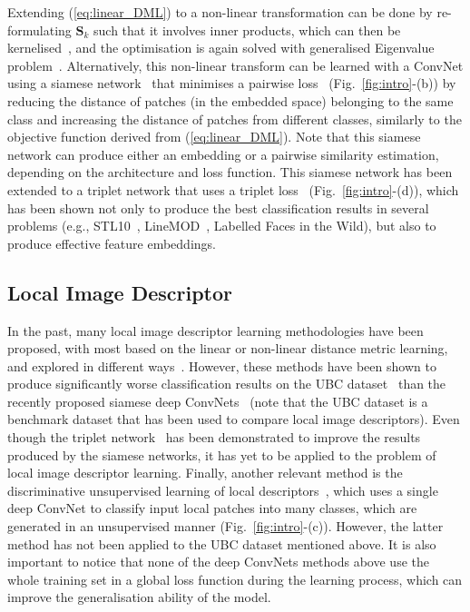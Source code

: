 \documentclass[10pt,twocolumn,letterpaper]{article}
\begin{document}
Extending (\ref{eq:linear_DML}) to a non-linear transformation can be done by re-formulating $\mathbf{S}_k$ such that it involves inner products, which can then be kernelised~\cite{sugiyama2007dimensionality}, and the optimisation is again solved with generalised Eigenvalue problem~\cite{sugiyama2007dimensionality}.
Alternatively, this non-linear transform can be learned with a ConvNet using a siamese network~\cite{bromley1993signature} that minimises a pairwise loss~\cite{chopra2005learning} (Fig.~\ref{fig:intro}-(b)) by reducing the distance of patches (in the embedded space) belonging to the same class and increasing the distance of patches from different classes, similarly to the objective function derived from (\ref{eq:linear_DML}).  Note that this siamese network can produce either an embedding or a pairwise similarity estimation, depending on the architecture and loss function.  This siamese network has been extended to a triplet network that uses a triplet loss~\cite{Wangcvpr14,hoffer2014deep,SchroffKPcvpr15,wohlhartcvpr15} (Fig.~\ref{fig:intro}-(d)), which has been shown not only to produce the best classification results in several problems (e.g., STL10~\cite{coates2011analysis}, LineMOD~\cite{hinterstoisser2012gradient}, Labelled Faces in the Wild), but also to produce effective feature embeddings.  


\subsection{Local Image Descriptor}


In the past, many local image descriptor learning methodologies have been proposed, with 
most based on the linear or non-linear distance metric learning, and explored in different ways~\cite{brownpami10,carneiro2010automatic,Simonyanpami14,trzcinski2013boosting}.  However, these methods have been shown to produce significantly worse classification results on the UBC dataset~\cite{UBC_dataset,brownpami10,snavely2008modeling} than the recently proposed siamese deep ConvNets~\cite{Han_cvpr15,masci2014descriptor,ZagoruykoCVPR15} (note that the UBC dataset is a benchmark dataset that has been used to compare local image descriptors).
Even though the triplet network~\cite{Wangcvpr14,hoffer2014deep,SchroffKPcvpr15,wohlhartcvpr15} has been demonstrated to improve the results produced by the siamese networks, it has yet to be applied to the problem of local image descriptor learning.
Finally, another relevant method is the discriminative unsupervised learning of local descriptors~\cite{dosovitskiy2014discriminative}, which uses a single deep ConvNet to classify input local patches into many classes, which are generated in an unsupervised manner (Fig.~\ref{fig:intro}-(c)).  However, the latter method has not been applied to the UBC dataset mentioned above.
It is also important to notice that none of the deep ConvNets methods above use the whole training set in a global loss function during the learning process, which can improve the generalisation ability of the model.
\end{document}
